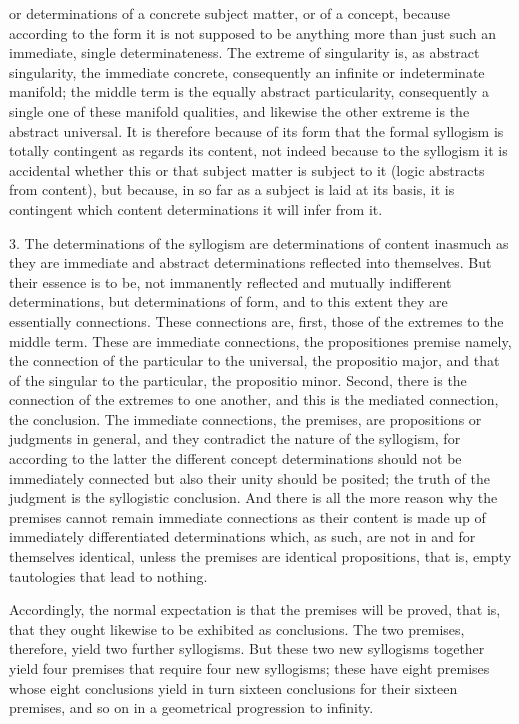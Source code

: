 or determinations of a concrete subject matter,
or of a concept, because according to the form it
is not supposed to be anything more than just
such an immediate, single determinateness.
The extreme of singularity is, as abstract singularity,
the immediate concrete, consequently
an infinite or indeterminate manifold;
the middle term is the equally abstract particularity,
consequently a single one of these manifold qualities,
and likewise the other extreme is the abstract universal.
It is therefore because of its form that the formal syllogism is
totally contingent as regards its content,
not indeed because to the syllogism it is accidental
whether this or that subject matter is subject to it
(logic abstracts from content),
but because, in so far as a subject is laid at its basis,
it is contingent which content determinations it will infer from it.

3. The determinations of the syllogism are
determinations of content inasmuch as
they are immediate and abstract determinations
reflected into themselves.
But their essence is to be, not immanently reflected and
mutually indifferent determinations,
but determinations of form,
and to this extent they are essentially connections.
These connections are,
first, those of the extremes to the middle term.
These are immediate connections,
the propositiones premise namely,
the connection of the particular to the universal,
the propositio major,
and that of the singular to the particular,
the propositio minor.
Second, there is the connection of the extremes to one
another, and this is the mediated connection, the conclusion.
The immediate connections, the premises, are
propositions or judgments in general,
and they contradict the nature of the syllogism,
for according to the latter the
different concept determinations should not be immediately connected
but also their unity should be posited;
the truth of the judgment is the syllogistic conclusion.
And there is all the more reason why the premises
cannot remain immediate connections as their content is made up of
immediately differentiated determinations
which, as such, are not in and for themselves identical,
unless the premises are identical propositions,
that is, empty tautologies that lead to nothing.

Accordingly, the normal expectation is
that the premises will be proved,
that is, that they ought likewise
to be exhibited as conclusions.
The two premises, therefore, yield two further syllogisms.
But these two new syllogisms together yield
four premises that require four new syllogisms;
these have eight premises whose eight conclusions yield
in turn sixteen conclusions for their sixteen premises,
and so on in a geometrical progression to infinity.

